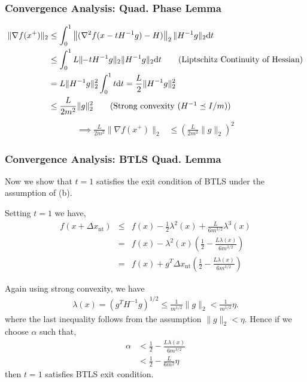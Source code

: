 \documentclass{beamer}
\newcommand{\be}{\begin{eqnarray}}
\newcommand{\ee}{\end{eqnarray}}
\begin{document}
\begin{frame}
    \frametitle{Convergence Analysis: Quad. Phase Lemma}
    \begin{align}
    \| \nabla f(x^{+})\|_2 &\leq \int_{0}^{1} \left\| (\nabla^2 f(x-tH^{-1}g) - H)\right\|_2 \|H^{-1}g\|_2 \mathrm{d}t \notag \\
	&\leq \int_{0}^{1} L \| \!\!-\!tH^{-1}g \|_2 \|H^{-1}g\|_2 \mathrm{d}t \tag{Liptschitz Continuity of Hessian} \\
	&= L \|H^{-1}g\|_2^2 \int_{0}^{1} t \mathrm{d}t = \frac{L}{2} \|H^{-1}g\|_2^2 \notag \\	
	&\leq \frac{L}{2m^2} \|g\|_2^2 \tag{Strong convexity ($H^{-1} \preceq I/m$)}
	\end{align}
	\begin{align}
 	\implies \frac{L}{2m^2} \| \nabla f(x^{+})\|_2 &\leq \left( \frac{L}{2m^2} \|g\|_2 \right)^2
    \end{align}
\end{frame}
\begin{frame}
    \frametitle{Convergence Analysis: BTLS Quad. Lemma}
    Now we show that $t = 1$ satisfies the exit condition of BTLS under the
    assumption of (b).

Setting $t=1$ we have,
\be
f(x+\Delta x_{\mathrm{nt}}) & \le& f(x) - \frac{1}{2} \lambda^2(x) + \frac{L}{6 m^{3/2}} \lambda^3(x)
\\ & =& f(x) - \lambda^2(x) \left(\frac{1}{2}  - \frac{L\lambda(x)}{6 m^{3/2}} \right )
\\ & =& f(x) + g^T \Delta x_{\mathrm{nt}} \left(\frac{1}{2}  - \frac{L\lambda(x)}{6 m^{3/2}} \right )
\ee
\end{frame}
\begin{frame}
Again using strong convexity, we have
\begin{align}
\lambda(x) = (g^T H^{-1} g )^{1/2} \le \frac{1}{m^{1/2}} \|g\|_2 < \frac{1}{m^{1/2}} \eta. 
\end{align}
where the last inequality follows from the assumption $\|g\|_2 < \eta $. 
Hence if we choose $\alpha$ such that,
\begin{align}
\alpha & < \frac{1}{2}  - \frac{L\lambda(x)}{6 m^{3/2}} %
\\ & < \frac{1}{2}  - \frac{L}{6 m^{2}}  \eta
\end{align}
then $t=1$ satisfies BTLS exit condition.
\end{frame}

\end{document}
